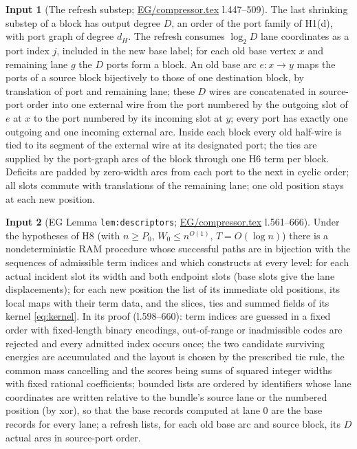 \documentclass[11pt]{article}
\theoremstyle{definition}
\newtheorem{hyp}{Input}
\theoremstyle{remark}
\newcommand{\src}[1]{\url{#1}}
\begin{document}
\begin{hyp}[The refresh substep; \src{EG/compressor.tex} l.447--509]\label{H11}
The last shrinking substep of a block has output degree $D$, an order of the port family of H1(d), with port graph of degree $d_H$.
The refresh consumes $\log_2D$ lane coordinates as a port index $j$, included in the new base label; for each old base vertex
$x$ and remaining lane $g$ the $D$ ports form a block. An old base arc $e:x\to y$ maps the ports of a source block bijectively to
those of one destination block, by translation of port and remaining lane; these $D$ wires are concatenated in source-port order
into one external wire from the port numbered by the outgoing slot of $e$ at $x$ to the port numbered by its incoming slot at
$y$; every port has exactly one outgoing and one incoming external arc. Inside each block every old half-wire is tied to its
segment of the external wire at its designated port; the ties are supplied by the port-graph arcs of the block through one H6
term per block. Deficits are padded by zero-width arcs from each port to the next in cyclic order; all slots commute with
translations of the remaining lane; one old position stays at each new position.
\end{hyp}

\begin{hyp}[EG Lemma \texttt{lem:descriptors}; \src{EG/compressor.tex} l.561--666]\label{H12}
Under the hypotheses of H8 (with $n\ge P_0$, $W_0\le n^{O(1)}$, $T=O(\log n)$) there is a nondeterministic RAM procedure whose
successful paths are in bijection with the sequences of admissible term indices and which constructs at every level: for each
actual incident slot its width and both endpoint slots (base slots give the lane displacements); for each new position the list
of its immediate old positions, its local maps with their term data, and the slices, ties and summed fields of its kernel
\eqref{eq:kernel}. In its proof (l.598--660): term indices are guessed in a fixed order with fixed-length binary encodings,
out-of-range or inadmissible codes are rejected and every admitted index occurs once; the two candidate surviving energies are
accumulated and the layout is chosen by the prescribed tie rule, the common mass cancelling and the scores being sums of squared
integer widths with fixed rational coefficients; bounded lists are ordered by identifiers whose lane coordinates are written
relative to the bundle's source lane or the numbered position (by xor), so that the base records computed at lane $0$ are the base
records for every lane; a refresh lists, for each old base arc and source block, its $D$ actual arcs in source-port order.
\end{hyp}
\end{document}
